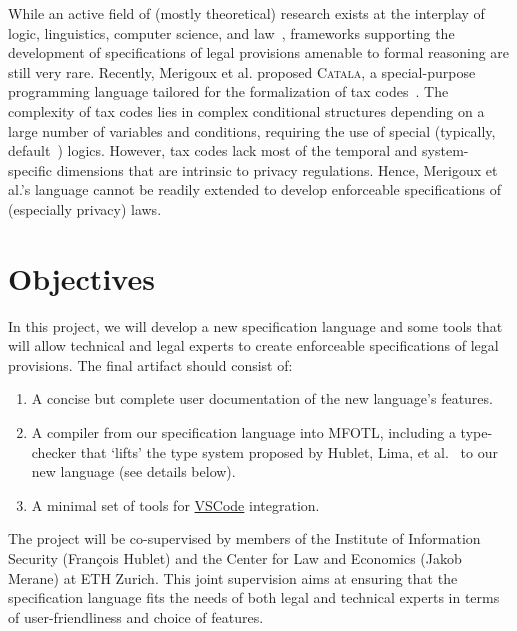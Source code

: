 \documentclass{proposal}
\begin{document}
While an active field of (mostly theoretical) research exists
at the interplay of logic, linguistics, computer science, and law~\cite{Gabbay2010}, frameworks supporting the development of specifications of legal provisions amenable
to formal reasoning are still very rare. Recently, Merigoux et al. proposed \textsc{Catala}, a special-purpose programming language tailored for the formalization of tax codes~\cite{Merigoux2021,Huttner2022}. The complexity of tax codes lies in
complex conditional structures depending on a large number of variables and 
conditions, requiring the use of special (typically, default~\cite{Antoniou1999}) logics. 
However, tax codes lack most of the temporal and system-specific
dimensions that are intrinsic to privacy regulations.
Hence, Merigoux et al.'s language cannot be readily extended
to develop enforceable specifications of (especially privacy) laws.


\section{Objectives}\label{sec:objectives}

In this project, we will develop a new specification language and some tools that will allow technical and legal experts to create enforceable specifications of legal provisions. The final artifact should consist of:
\begin{enumerate}
\item A concise but complete user documentation of the new language's  features.
\item A compiler from our specification language into MFOTL, including a type-checker that `lifts' the type system proposed by Hublet, Lima, et al.~\cite{Hublet2024} to our new language (see details below).
\item A minimal set of tools for \href{https://code.visualstudio.com/}{VSCode} integration.
\end{enumerate}
The project will be co-supervised by members of the Institute of Information Security (François Hublet) and the Center for Law and Economics (Jakob Merane) at ETH Zurich. This joint supervision aims at ensuring that the specification language fits the needs of both legal and technical experts in terms of user-friendliness and choice of features.
\end{document}
